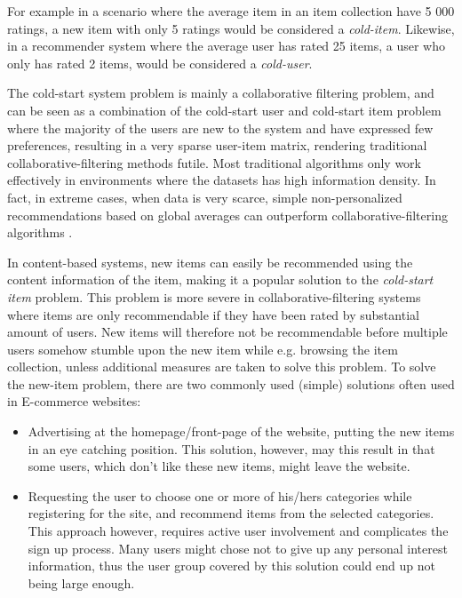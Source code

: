 For example in a scenario where the average item in an item collection have 5 000 ratings, a new item with only 5 ratings would be considered a \emph{cold-item}. Likewise, in a recommender system where the average user has rated 25 items, a user who only has rated 2 items, would be considered a \emph{cold-user}.

The cold-start system problem is mainly a collaborative filtering problem, and
can be seen as a combination of the cold-start user and cold-start item problem
where the majority of the users are new to the system and have expressed few
preferences, resulting in a very sparse user-item matrix, rendering traditional collaborative-filtering methods futile. Most traditional algorithms only work effectively in environments where the datasets has high information density. In fact, in extreme cases, when data is very scarce, simple non-personalized recommendations based on global
averages can outperform collaborative-filtering algorithms \cite{Park2006}.

In content-based systems, new items can easily be
recommended using the content information of the item, making it a popular
solution to the \emph{cold-start item} problem. This problem is more
severe in collaborative-filtering systems where items are only recommendable if
they have been rated by substantial amount of users. New items will therefore not be
recommendable before multiple users somehow stumble upon the new item while
e.g. browsing the item collection, unless additional measures are taken to
solve this problem. To solve the new-item problem, there are two commonly used (simple) solutions often used in E-commerce websites:

\begin{itemize}
\item Advertising at the homepage/front-page of the website, putting the new
items in an eye catching position. This solution, however, may this result in
that some users, which don't like these new items, might leave the website.
\item Requesting the user to choose one or more of his/hers categories while
registering for the site, and recommend items from the selected categories.
This approach however, requires active user involvement and complicates the
sign up process. Many users might chose not to give up any
personal interest information, thus the user group covered by this solution could end up not being large enough.
\end{itemize}

